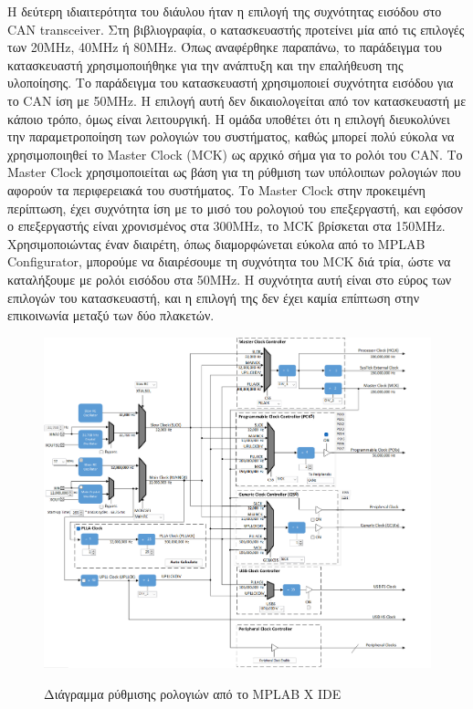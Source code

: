 \documentclass[a4paper,nobib,justified]{tufte-book}
\begin{document}
Η δεύτερη ιδιαιτερότητα του διάυλου ήταν η επιλογή της συχνότητας εισόδου στο CAN transceiver. Στη βιβλιογραφία, ο κατασκευαστής προτείνει μία από τις επιλογές των 20MHz, 40MHz ή 80MHz. Όπως αναφέρθηκε παραπάνω, το παράδειγμα του κατασκευαστή χρησιμοποιήθηκε για την ανάπτυξη και την επαλήθευση της υλοποίησης. Το παράδειγμα του κατασκευαστή χρησιμοποιεί συχνότητα εισόδου για το CAN ίση με 50MHz. Η επιλογή αυτή δεν δικαιολογείται από τον κατασκευαστή με κάποιο τρόπο, όμως είναι λειτουργική. Η ομάδα υποθέτει ότι η επιλογή διευκολύνει την παραμετροποίηση των ρολογιών του συστήματος, καθώς μπορεί πολύ εύκολα να χρησιμοποιηθεί το Master Clock (MCK) ως αρχικό σήμα για το ρολόι του CAN. Το Master Clock χρησιμοποιείται ως βάση για τη ρύθμιση των υπόλοιπων ρολογιών που αφορούν τα περιφερειακά του συστήματος. Το Master Clock στην προκειμένη περίπτωση, έχει συχνότητα ίση με το μισό του ρολογιού του επεξεργαστή, και εφόσον ο επεξεργαστής είναι χρονισμένος στα 300MHz, το MCK βρίσκεται στα 150MHz. Χρησιμοποιώντας έναν διαιρέτη, όπως διαμορφώνεται εύκολα από το MPLAB Configurator, μπορούμε να διαιρέσουμε τη συχνότητα του MCK διά τρία, ώστε να καταλήξουμε με ρολόι εισόδου στα 50MHz. Η συχνότητα αυτή είναι στο εύρος των επιλογών του κατασκευαστή, και η επιλογή της δεν έχει καμία επίπτωση στην επικοινωνία μεταξύ των δύο πλακετών.

\begin{figure}[ht]
	\includegraphics{media/images/mplab-clock-diagram.png}
	\label{fig:mplab-clock}
	\caption{Διάγραμμα ρύθμισης ρολογιών από το MPLAB X IDE}
\end{figure}
\end{document}
